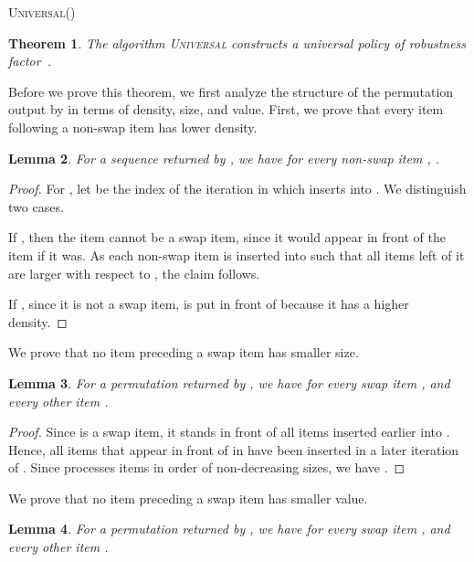 \documentclass[11pt]{article}
\newcommand{\noun}[1]{\textsc{#1}}
\newtheorem{theorem}{Theorem}
\newtheorem{lemma}[theorem]{Lemma}
\begin{document}
\begin{algorithm}[tb]   
  \DontPrintSemicolon 
  \caption{\textsc{Universal}()\label{our_algo}}
 
  \;
  \;
  
  \For{}   
  {     
    {\;}     
    \Else     
    {       
      \;       
      { \; }       
      \;     
    }   
  }
  \Return \; 
\end{algorithm}
\begin{theorem}
The algorithm \noun{Universal} constructs a universal policy of robustness
factor~. \label{thm:2-competitive} 
\end{theorem}
Before we prove this theorem, we first analyze the structure of the
permutation output by  in terms of density, size,
and value. First, we prove that every item following a non-swap item
has lower density.
\begin{lemma}
For a sequence  returned by , we have 
for every non-swap item , . \label{lem:densities} \end{lemma}
\begin{proof}
For , let  be the index of
the iteration in which  inserts  into
. We distinguish two cases.

If , then the item  cannot be a swap item,
since it would appear in front of the item  if it was. As
each non-swap item is inserted into  such that all items left
of it are larger with respect to , the claim follows.

If , since it is not a swap item,  is put
in front of  because it has a higher density.  
\end{proof}
We prove that no item preceding a swap item has smaller size.
\begin{lemma}
For a permutation  returned by , we have
 for every swap item ,
and every other item . \label{lem:sizes} \end{lemma}
\begin{proof}
Since  is a swap item, it stands in front of all items inserted
earlier into . Hence, all items that appear in front of 
in  have been inserted in a later iteration of .
Since  processes items in order of non-decreasing
sizes, we have .  
\end{proof}
We prove that no item preceding a swap item has smaller value.
\begin{lemma}
For a permutation  returned by , we have
 for every swap item ,
and every other item . \label{lem:values} \end{lemma}
\end{document}
